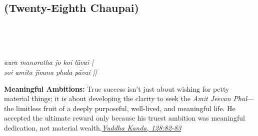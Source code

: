 
\newpage

\subsection*{ (Twenty-Eighth Chaupai)}

\begin{minipage}[t]{0.55\textwidth}
\vspace{0pt}

{\large \linespread{1.5}\selectfont
{}\\
\par}

\vspace{0.5em}

{\large \linespread{1.5}\selectfont
{}\\
\par}

\vspace{0.5em}

{\large \linespread{1.3}\selectfont
\textit{aura manoratha jo koi lāvai |}\\
\textit{soi amita jīvana phala pāvai ||}
\par}
\end{minipage}%
\hfill
\begin{minipage}[t]{0.42\textwidth}
\vspace{0pt}
\begin{tcolorbox}[anchorbox]
\textbf{Meaningful Ambitions:} True success isn't just about wishing for petty material things; it is about developing the clarity to seek the \textit{Amit Jeevan Phal}—the limitless fruit of a deeply purposeful, well-lived, and meaningful life.
\vspace{0.5em}\newline He accepted the ultimate reward only because his truest ambition was meaningful dedication, not material wealth.\newline\null\hfill\href{https://www.valmiki.iitk.ac.in/sloka?field_kanda_tid=6&language=dv&field_sarga_value=128}{\textit{Yuddha Kanda, 128:82-83}}
\end{tcolorbox}
\end{minipage}

\vspace{0.5em}
